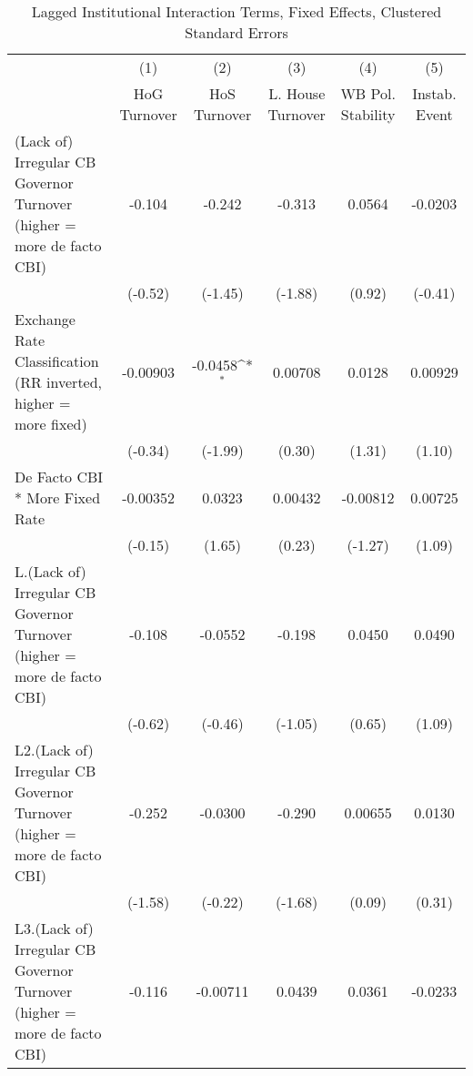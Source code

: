 {
\def\sym#1{\ifmmode^{#1}\else\(^{#1}\)\fi}
\begin{longtable}{l*{5}{c}}
\caption{Lagged Institutional Interaction Terms, Fixed Effects, Clustered Standard Errors \label{intlagsDF}}\\
\hline\hline\endfirsthead\hline\endhead\hline\endfoot\endlastfoot
                &\multicolumn{1}{c}{(1)}&\multicolumn{1}{c}{(2)}&\multicolumn{1}{c}{(3)}&\multicolumn{1}{c}{(4)}&\multicolumn{1}{c}{(5)}\\
                &\multicolumn{1}{c}{HoG Turnover}&\multicolumn{1}{c}{HoS Turnover}&\multicolumn{1}{c}{L. House Turnover}&\multicolumn{1}{c}{WB Pol. Stability}&\multicolumn{1}{c}{Instab. Event}\\
\hline
(Lack of) Irregular CB Governor Turnover (higher = more de facto CBI)&   -0.104         &   -0.242         &   -0.313         &   0.0564         &  -0.0203         \\
                &  (-0.52)         &  (-1.45)         &  (-1.88)         &   (0.92)         &  (-0.41)         \\
[1em]
Exchange Rate Classification (RR inverted, higher = more fixed)& -0.00903         &  -0.0458\sym{*}  &  0.00708         &   0.0128         &  0.00929         \\
                &  (-0.34)         &  (-1.99)         &   (0.30)         &   (1.31)         &   (1.10)         \\
[1em]
De Facto CBI * More Fixed Rate& -0.00352         &   0.0323         &  0.00432         & -0.00812         &  0.00725         \\
                &  (-0.15)         &   (1.65)         &   (0.23)         &  (-1.27)         &   (1.09)         \\
[1em]
L.(Lack of) Irregular CB Governor Turnover (higher = more de facto CBI)&   -0.108         &  -0.0552         &   -0.198         &   0.0450         &   0.0490         \\
                &  (-0.62)         &  (-0.46)         &  (-1.05)         &   (0.65)         &   (1.09)         \\
[1em]
L2.(Lack of) Irregular CB Governor Turnover (higher = more de facto CBI)&   -0.252         &  -0.0300         &   -0.290         &  0.00655         &   0.0130         \\
                &  (-1.58)         &  (-0.22)         &  (-1.68)         &   (0.09)         &   (0.31)         \\
[1em]
L3.(Lack of) Irregular CB Governor Turnover (higher = more de facto CBI)&   -0.116         & -0.00711         &   0.0439         &   0.0361         &  -0.0233         \\

\end{longtable}}
